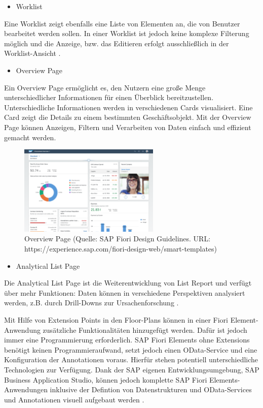 \begin{itemize}[noitemsep]
\item Worklist
\end{itemize}

Eine Worklist zeigt ebenfalls eine Liste von Elementen an, die von Benutzer bearbeitet werden sollen. In einer Worklist ist jedoch keine komplexe Filterung möglich und die Anzeige, bzw. das Editieren erfolgt ausschließlich in der Worklist-Ansicht \cite{sap:ufef}.

\begin{itemize}[noitemsep]
\item Overview Page
\end{itemize}

Ein Overview Page ermöglicht es, den Nutzern eine große Menge unterschiedlicher Informationen für einen Überblick bereitzustellen. Unterschiedliche Informationen werden in verschiedenen Cards visualisiert. Eine Card zeigt die Details zu einem bestimmten Geschäftsobjekt. Mit der Overview Page können Anzeigen, Filtern und Verarbeiten von Daten einfach und effizient gemacht werden.

\begin{figure}[htbp]
 \centering
 \includegraphics[width=0.6\textwidth]{Bilder/fiori_element/Overview-page.png}
 \caption{Overview Page (Quelle: SAP Fiori Design Guidelines. URL: https://experience.sap.com/fiori-design-web/smart-templates)}
\end{figure} 

\begin{itemize}[noitemsep]
\item Analytical List Page
\end{itemize}

Die Analytical List Page ist die Weiterentwicklung von List Report und verfügt über mehr Funktionen: Daten können in verschiedene Perspektiven analysiert werden, z.B. durch Drill-Downs zur Ursachenforschung \cite{sap:ufef}.

Mit Hilfe von Extension Points in den Floor-Plans können in einer Fiori Element-Anwendung zusätzliche Funktionalitäten hinzugefügt werden. Dafür ist jedoch immer eine Programmierung erforderlich.
SAP Fiori Elements ohne Extensions benötigt keinen Programmieraufwand, setzt jedoch einen OData-Service und eine Konfiguration der Annotationen voraus. Hierfür stehen potentiell unterschiedliche Technologien zur Verfügung. Dank der SAP eigenen Entwicklungsumgebung, SAP Business Application Studio, können jedoch komplette SAP Fiori Elements-Anwendungen inklusive der Defintion von Datenstrukturen und OData-Services und Annotationen visuell aufgebaut werden \cite{sap:dafe}.



